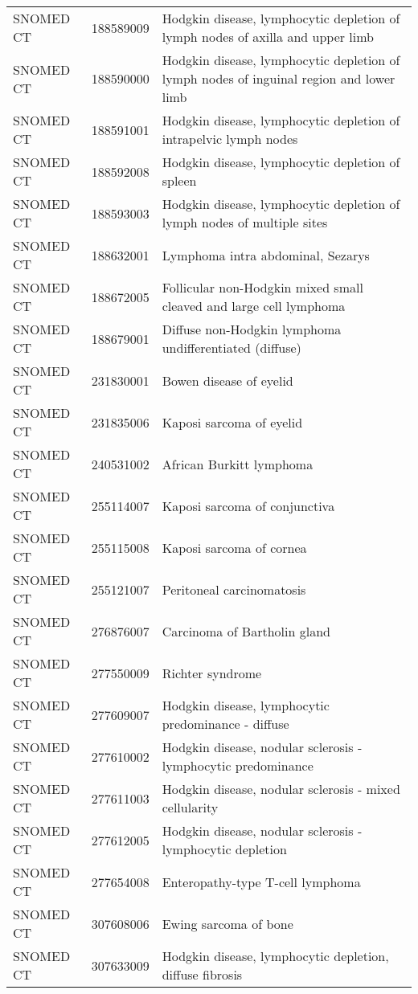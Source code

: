 \begin{longtable}{p{}p{}p{}}
  SNOMED CT & 188589009 & Hodgkin disease, lymphocytic depletion of lymph nodes of axilla and upper limb \\ 
  SNOMED CT & 188590000 & Hodgkin disease, lymphocytic depletion of lymph nodes of inguinal region and lower limb \\ 
  SNOMED CT & 188591001 & Hodgkin disease, lymphocytic depletion of intrapelvic lymph nodes \\ 
  SNOMED CT & 188592008 & Hodgkin disease, lymphocytic depletion of spleen \\ 
  SNOMED CT & 188593003 & Hodgkin disease, lymphocytic depletion of lymph nodes of multiple sites \\ 
  SNOMED CT & 188632001 & Lymphoma intra abdominal, Sezarys \\ 
  SNOMED CT & 188672005 & Follicular non-Hodgkin mixed small cleaved and large cell lymphoma \\ 
  SNOMED CT & 188679001 & Diffuse non-Hodgkin lymphoma undifferentiated (diffuse) \\ 
  SNOMED CT & 231830001 & Bowen disease of eyelid \\ 
  SNOMED CT & 231835006 & Kaposi sarcoma of eyelid \\ 
  SNOMED CT & 240531002 & African Burkitt lymphoma \\ 
  SNOMED CT & 255114007 & Kaposi sarcoma of conjunctiva \\ 
  SNOMED CT & 255115008 & Kaposi sarcoma of cornea \\ 
  SNOMED CT & 255121007 & Peritoneal carcinomatosis \\ 
  SNOMED CT & 276876007 & Carcinoma of Bartholin gland \\ 
  SNOMED CT & 277550009 & Richter syndrome \\ 
  SNOMED CT & 277609007 & Hodgkin disease, lymphocytic predominance - diffuse \\ 
  SNOMED CT & 277610002 & Hodgkin disease, nodular sclerosis - lymphocytic predominance \\ 
  SNOMED CT & 277611003 & Hodgkin disease, nodular sclerosis - mixed cellularity \\ 
  SNOMED CT & 277612005 & Hodgkin disease, nodular sclerosis - lymphocytic depletion \\ 
  SNOMED CT & 277654008 & Enteropathy-type T-cell lymphoma \\ 
  SNOMED CT & 307608006 & Ewing sarcoma of bone \\ 
  SNOMED CT & 307633009 & Hodgkin disease, lymphocytic depletion, diffuse fibrosis \\ 

\end{longtable}
